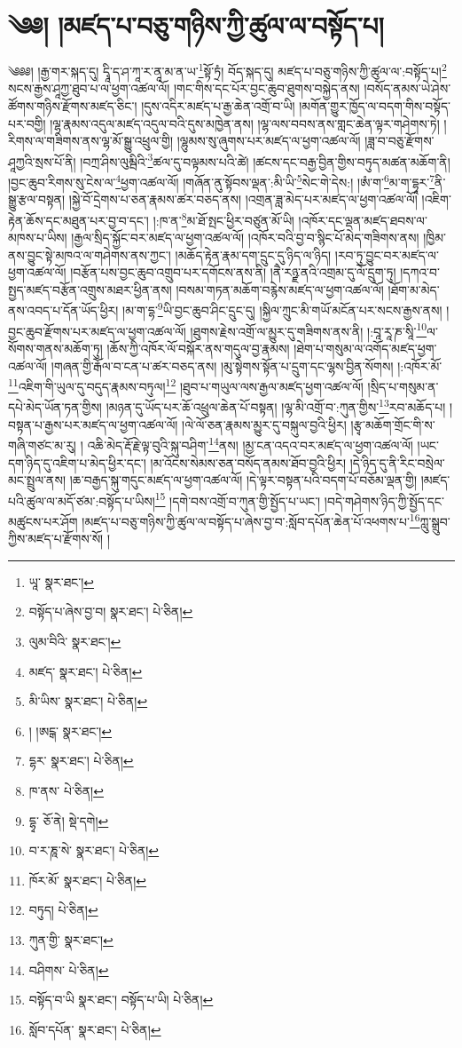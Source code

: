 \setcounter{footnote}{0} 
\chapter{༄༅། །མཛད་པ་བཅུ་གཉིས་ཀྱི་ཚུལ་ལ་བསྟོད་པ།}༄༅༅། །རྒྱ་གར་སྐད་དུ། དྭཱི་ད་ཤ་ཀཱ་ར་ནཱ་མ་ན་ཡ་\footnote{ཡཱ་  སྣར་ཐང་། }སྟོ་ཏྲཾ། བོད་སྐད་དུ། མཛད་པ་བཅུ་གཉིས་ཀྱི་ཚུལ་ལ་:བསྟོད་པ།\footnote{བསྟོད་པ་ཞེས་བྱ་བ།  སྣར་ཐང་།  པེ་ཅིན། } སངས་རྒྱས་ཤཱཀྱ་ཐུབ་པ་ལ་ཕྱག་འཚལ་ལོ། །གང་གིས་དང་པོར་བྱང་ཆུབ་ཐུགས་བསྐྱེད་ནས། །བསོད་ནམས་ཡེ་ཤེས་ཚོགས་གཉིས་རྫོགས་མཛད་ཅིང་། །དུས་འདིར་མཛད་པ་རྒྱ་ཆེན་འགྲོ་བ་ཡི། །མགོན་གྱུར་ཁྱོད་ལ་བདག་གིས་བསྟོད་པར་བགྱི། །ལྷ་རྣམས་འདུལ་མཛད་འདུལ་བའི་དུས་མཁྱེན་ནས། །ལྷ་ལས་བབས་ནས་གླང་ཆེན་ལྟར་གཤེགས་ཏེ། །རིགས་ལ་གཟིགས་ནས་ལྷ་མོ་སྒྱུ་འཕྲུལ་གྱི། །ལྷུམས་སུ་ཞུགས་པར་མཛད་ལ་ཕྱག་འཚལ་ལོ། །ཟླ་བ་བཅུ་རྫོགས་ཤཱཀྱའི་སྲས་པོ་ནི། །བཀྲ་ཤིས་ལུམྦིའི་\footnote{ལུམ་བིའི་  སྣར་ཐང་། }ཚལ་དུ་བལྟམས་པའི་ཚེ། །ཚངས་དང་བརྒྱ་བྱིན་གྱིས་བཏུད་མཚན་མཆོག་ནི། །བྱང་ཆུབ་རིགས་སུ་ངེས་ལ་\footnote{མཛད་  སྣར་ཐང་།  པེ་ཅིན། }ཕྱག་འཚལ་ལོ། །གཞོན་ནུ་སྟོབས་ལྡན་:མི་ཡི་\footnote{མི་ཡིས་  སྣར་ཐང་།  པེ་ཅིན། }སེང་གེ་དེས:། །ཨཾ་ག་\footnote{། །ཨངྒ་  སྣར་ཐང་། }མ་ག་དྷཱར་\footnote{དྷར་  སྣར་ཐང་།  པེ་ཅིན། }ནི་སྒྱུ་རྩལ་བསྟན། །སྐྱེ་བོ་དྲེགས་པ་ཅན་རྣམས་ཚར་བཅད་ནས། །འགྲན་ཟླ་མེད་པར་མཛད་ལ་ཕྱག་འཚལ་ལོ། །འཇིག་རྟེན་ཆོས་དང་མཐུན་པར་བྱ་བ་དང་། །:ཁ་ན་\footnote{ཁ་ནས་  པེ་ཅིན། }མ་ཐོ་སྤང་ཕྱིར་བཙུན་མོ་ཡི། །འཁོར་དང་ལྡན་མཛད་ཐབས་ལ་མཁས་པ་ཡིས། །རྒྱལ་སྲིད་སྐྱོང་བར་མཛད་ལ་ཕྱག་འཚལ་ལོ། །འཁོར་བའི་བྱ་བ་སྙིང་པོ་མེད་གཟིགས་ནས། །ཁྱིམ་ནས་བྱུང་སྟེ་མཁའ་ལ་གཤེགས་ནས་ཀྱང་། །མཆོད་རྟེན་རྣམ་དག་དྲུང་དུ་ཉིད་ལ་ཉིད། །རབ་ཏུ་བྱུང་བར་མཛད་ལ་ཕྱག་འཚལ་ལོ། །བརྩོན་པས་བྱང་ཆུབ་འགྲུབ་པར་དགོངས་ནས་ནི། །ནཻ་རཉྫ་ནའི་འགྲམ་དུ་ལོ་དྲུག་ཏུ། །དཀའ་བ་སྤྱད་མཛད་བརྩོན་འགྲུས་མཐར་ཕྱིན་ནས། །བསམ་གཏན་མཆོག་བརྙེས་མཛད་ལ་ཕྱག་འཚལ་ལོ། །ཐོག་མ་མེད་ནས་འབད་པ་དོན་ཡོད་ཕྱིར། །མ་ག་དྷ་\footnote{དྷྭ་  ཅོ་ནེ།  སྡེ་དགེ། }ཡི་བྱང་ཆུབ་ཤིང་དྲུང་དུ། །སྐྱིལ་ཀྲུང་མི་གཡོ་མངོན་པར་སངས་རྒྱས་ནས། །བྱང་ཆུབ་རྫོགས་པར་མཛད་ལ་ཕྱག་འཚལ་ལོ། །ཐུགས་རྗེས་འགྲོ་ལ་མྱུར་དུ་གཟིགས་ནས་ནི། །:བཱ་རཱ་ཎ་སཱི་\footnote{བ་ར་ཎཱ་སེ་  སྣར་ཐང་།  པེ་ཅིན། }ལ་སོགས་གནས་མཆོག་ཏུ། །ཆོས་ཀྱི་འཁོར་ལོ་བསྐོར་ནས་གདུལ་བྱ་རྣམས། །ཐེག་པ་གསུམ་ལ་འགོད་མཛད་ཕྱག་འཚལ་ལོ། །གཞན་གྱི་རྒོལ་བ་ངན་པ་ཚར་བཅད་ནས། །མུ་སྟེགས་སྟོན་པ་དྲུག་དང་ལྷས་བྱིན་སོགས། །:འཁོར་མོ་\footnote{ཁོར་མོ་  སྣར་ཐང་།  པེ་ཅིན། }འཇིག་གི་ཡུལ་དུ་བདུད་རྣམས་བཏུལ།\footnote{བཏུད།  པེ་ཅིན། } །ཐུབ་པ་གཡུལ་ལས་རྒྱལ་མཛད་ཕྱག་འཚལ་ལོ། །སྲིད་པ་གསུམ་ན་དཔེ་མེད་ཡོན་ཏན་གྱིས། །མཉན་དུ་ཡོད་པར་ཆོ་འཕྲུལ་ཆེན་པོ་བསྟན། །ལྷ་མི་འགྲོ་བ་:ཀུན་གྱིས་\footnote{ཀུན་གྱི་  སྣར་ཐང་། }རབ་མཆོད་པ། །བསྟན་པ་རྒྱས་པར་མཛད་ལ་ཕྱག་འཚལ་ལོ། །ལེ་ལོ་ཅན་རྣམས་མྱུར་དུ་བསྐུལ་བྱའི་ཕྱིར། །རྩྭ་མཆོག་གྲོང་གི་ས་གཞི་གཙང་མ་རུ། །
འཆི་མེད་རྡོ་རྗེ་ལྟ་བུའི་སྐུ་བཤིག་\footnote{བཤིགས་  པེ་ཅིན། }ནས། །མྱ་ངན་འདའ་བར་མཛད་ལ་ཕྱག་འཚལ་ལོ། །ཡང་དག་ཉིད་དུ་འཇིག་པ་མེད་ཕྱིར་དང་། །མ་འོངས་སེམས་ཅན་བསོད་ནམས་ཐོབ་བྱའི་ཕྱིར། །དེ་ཉིད་དུ་ནི་རིང་བསྲེལ་མང་སྤྲུལ་ནས། །ཆ་བརྒྱད་སྐུ་གདུང་མཛད་ལ་ཕྱག་འཚལ་ལོ། །དེ་ལྟར་བསྟན་པའི་བདག་པོ་བཅོམ་ལྡན་གྱི། །མཛད་པའི་ཚུལ་ལ་མདོ་ཙམ་:བསྟོད་པ་ཡིས།\footnote{བསྟོད་བ་ཡི  སྣར་ཐང་། བསྟོད་པ་ཡི།  པེ་ཅིན། } །དགེ་བས་འགྲོ་བ་ཀུན་གྱི་སྤྱོད་པ་ཡང་། །བདེ་གཤེགས་ཉིད་ཀྱི་སྤྱོད་དང་མཚུངས་པར་ཤོག །མཛད་པ་བཅུ་གཉིས་ཀྱི་ཚུལ་ལ་བསྟོད་པ་ཞེས་བྱ་བ་:སློབ་དཔོན་ཆེན་པོ་འཕགས་པ་\footnote{སློབ་དཔོན་  སྣར་ཐང་།  པེ་ཅིན། }ཀླུ་སྒྲུབ་ཀྱིས་མཛད་པ་རྫོགས་སོ། ། 